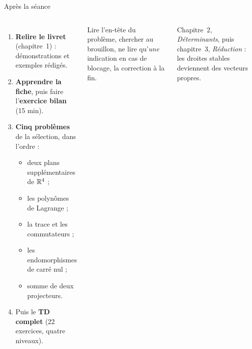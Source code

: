 \documentclass[aspectratio=169,10pt]{beamer}
\begin{document}
\begin{frame}{Après la séance}
\begin{columns}[T]
\begin{enumerate}
\item \textbf{Relire le livret} (chapitre~1) : démonstrations et exemples rédigés.
\item \textbf{Apprendre la fiche}, puis faire l'\textbf{exercice bilan} (15 min).
\item \textbf{Cinq problèmes} de la sélection, dans l'ordre :
\begin{itemize}\small
\item deux plans supplémentaires de $\mathbb{R}^4$ ;
\item les polynômes de Lagrange ;
\item la trace et les commutateurs ;
\item les endomorphismes de carré nul ;
\item somme de deux projecteurs.
\end{itemize}
\item Puis le \textbf{TD complet} (22 exercices, quatre niveaux).
\end{enumerate}
\begin{ASTU}
Lire l'en-tête du problème, chercher au brouillon, ne lire qu'\emph{une} indication en cas de blocage, la correction à la fin.
\end{ASTU}
\begin{ASTU}[La suite]
Chapitre~2, \emph{Déterminants}, puis chapitre~3, \emph{Réduction} : les droites stables deviennent des vecteurs propres.
\end{ASTU}
\end{columns}
\end{frame}
\end{document}
